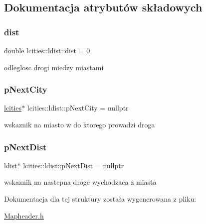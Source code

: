 \subsection{Dokumentacja atrybutów składowych}
\mbox{\label{structlcities_1_1ldist_a7bd7a2a51dcb4918af11c8f6da7191d5}} 
\subsubsection{\texorpdfstring{dist}{dist}}
{\footnotesize\ttfamily double lcities\+::ldist\+::dist = 0}

odleglosc drogi miedzy miastami \mbox{\label{structlcities_1_1ldist_ab6641f5f7e8a9b3f5bee7ad9be7d3ecb}} 
\subsubsection{\texorpdfstring{p\+Next\+City}{pNextCity}}
{\footnotesize\ttfamily \mbox{\hyperlink{structlcities}{lcities}}$\ast$ lcities\+::ldist\+::p\+Next\+City = nullptr}

wskaznik na miasto w do ktorego prowadzi droga \mbox{\label{structlcities_1_1ldist_af615449e5ee90bff344ca3169a3c1c7b}} 
\subsubsection{\texorpdfstring{p\+Next\+Dist}{pNextDist}}
{\footnotesize\ttfamily \mbox{\hyperlink{structlcities_1_1ldist}{ldist}}$\ast$ lcities\+::ldist\+::p\+Next\+Dist = nullptr}

wskaznik na nastepna droge wychodzaca z miasta 

Dokumentacja dla tej struktury została wygenerowana z pliku\+:\begin{DoxyCompactItemize}
\item 
\mbox{\hyperlink{_mapheader_8h}{Mapheader.\+h}}\end{DoxyCompactItemize}
